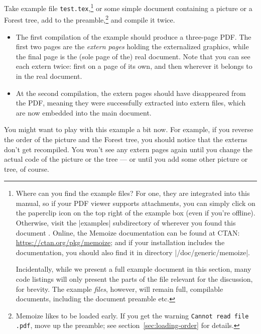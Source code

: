 \documentclass[a4paper,11pt]{article}
\begin{document}
Take example file \texttt{test.tex},\footnote{Where can you find
  the example files?  For one, they are integrated into this manual, so if your
  PDF viewer supports attachments, you can simply click on the paperclip icon
  on the top right of the example box (even if you're offline).  Otherwise,
  visit the |examples| subdirectory of wherever you found this document
  \Smiley.  Online, the Memoize documentation can be found at CTAN:
  \url{https://ctan.org/pkg/memoize}; and if your  installation
  includes the documentation, you should also find it in directory |/doc/generic/memoize|.
  
  Incidentally, while we present a full example document in this section, many
  code listings will only present the parts of the file relevant for the
  discussion, for brevity.  The example \emph{files}, however, will remain
  full, compilable documents, including the document preamble etc.} or some
simple document containing a \TikZ picture or a Forest tree, add
\EmphVerbatim{\usepackage{memoize}} to the preamble,\footnote{Memoize likes to
  be loaded early.  If you get the warning \texttt{Cannot read file
    .pdf}, move  up the
  preamble; see section~\ref{sec:loading-order} for details.} and compile it
twice.

\begin{itemize}
\item The first compilation of the example should produce a three-page PDF.
  The first two pages are the \emph{extern pages} holding the externalized
  graphics, while the final page is the (sole page of the) real document.  Note
  that you can see each extern twice: first on a page of its own, and then
  wherever it belongs to in the real document.
\item At the second compilation, the extern pages should have disappeared from
  the PDF, meaning they were successfully extracted into extern files, which
  are now embedded into the main document.
\end{itemize}


You might want to play with this example a bit now.
For example, if you reverse the order of the \TikZ picture and the Forest
tree, you should notice that the externs don't get recompiled.  You won't see
any extern pages again until you change the actual code of the picture or the
tree --- or until you add some other picture or tree, of course.
\end{document}
